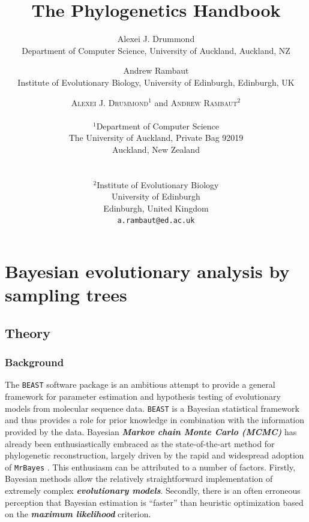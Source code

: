 \documentclass[cup7b, english]{cupbook}
\title{The Phylogenetics Handbook}
\begin{document}
\maketitle
\tableofcontents
\cleardoublepage
{}

\setcounter{chapter}{17}

\author[Alexei J. Drummond and Andrew Rambaut]
{Alexei J. Drummond \\ Department of Computer Science,
University of Auckland, Auckland, NZ
\and
Andrew Rambaut \\ Institute of Evolutionary Biology, University of Edinburgh,
 Edinburgh, UK}

\chapter{Bayesian evolutionary analysis by sampling trees}

\author{\textsc{Alexei J. Drummond}$^{1}$ and \textsc{Andrew Rambaut}$^{2}$\\
 \\
$^{1}$Department of Computer Science\\
 The University of Auckland, Private Bag 92019\\
 Auckland, New Zealand\\
\\
\\
$^{2}$Institute of Evolutionary Biology\\
 University of Edinburgh\\
 Edinburgh, United Kingdom\\
 \texttt{a.rambaut@ed.ac.uk} }

\section{Theory}

\subsection{Background}

The \texttt{BEAST} software package is an ambitious attempt to provide a general
framework for parameter estimation and hypothesis testing of evolutionary
models from molecular sequence data. \texttt{BEAST} is a Bayesian statistical
framework and thus provides a role for prior knowledge in combination with the
information provided by the data. Bayesian \textbf{\textit{Markov chain Monte Carlo (MCMC)}} has
already been enthusiastically embraced as the state-of-the-art method for phylogenetic
reconstruction, largely driven by the rapid and widespread adoption of \texttt{MrBayes}
\cite{HR2001}. This enthusiasm can be attributed to a number of factors.
Firstly, Bayesian methods allow the relatively straightforward implementation
of extremely complex \textbf{\textit{evolutionary models}}. Secondly, there is an often erroneous
perception that Bayesian estimation is ``faster'' than heuristic
optimization based on the \textbf{\textit{maximum likelihood}} criterion.
\end{document}
